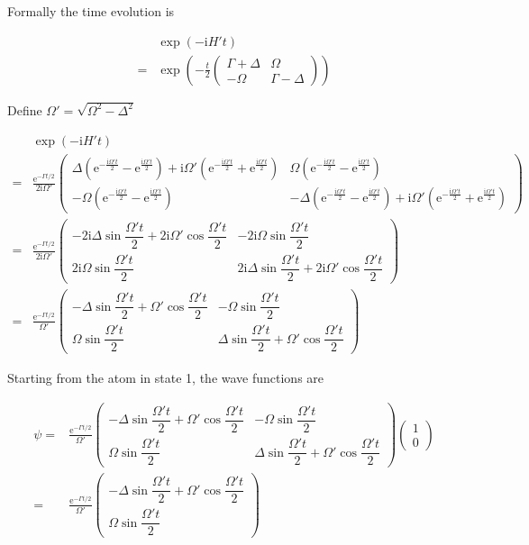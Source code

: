 \documentclass[10pt,fleqn]{article}
\newcommand{\ue}{\mathrm{e}}
\newcommand{\ui}{\mathrm{i}}
\newcommand{\eqar}[1]
{
  \begin{align*}
    #1
  \end{align*}
}
\newcommand{\paren}[1]{{\left({#1}\right)}}
\begin{document}
Formally the time evolution is
\eqar{
  &\exp\paren{-\ui H't}\\
  =&\exp\paren{-\frac t2\begin{pmatrix}
      \Gamma+\Delta&\Omega\\
      -\Omega&\Gamma-\Delta
    \end{pmatrix}}
}
Define $\Omega'=\sqrt{\Omega^2-\Delta^2}$
\eqar{
  &\exp\paren{-\ui H't}\\
  =&\frac{\ue^{-\Gamma t/2}}{2\ui\Omega'}\begin{pmatrix}
    \Delta\paren{\ue^{-\frac{\ui\Omega't}{2}}-\ue^{\frac{\ui\Omega't}{2}}}+\ui\Omega'\paren{\ue^{-\frac{\ui\Omega't}{2}}+\ue^{\frac{\ui\Omega't}{2}}}&\Omega\paren{\ue^{-\frac{\ui\Omega't}{2}}-\ue^{\frac{\ui\Omega't}{2}}}\\
    -\Omega\paren{\ue^{-\frac{\ui\Omega't}{2}}-\ue^{\frac{\ui\Omega't}{2}}}&-\Delta\paren{\ue^{-\frac{\ui\Omega't}{2}}-\ue^{\frac{\ui\Omega't}{2}}}+\ui\Omega'\paren{\ue^{-\frac{\ui\Omega't}{2}}+\ue^{\frac{\ui\Omega't}{2}}}
  \end{pmatrix}\\
  =&\frac{\ue^{-\Gamma t/2}}{2\ui\Omega'}\begin{pmatrix}
    -2\ui\Delta\sin\dfrac{\Omega't}{2}+2\ui\Omega'\cos\dfrac{\Omega't}{2}&-2\ui\Omega\sin\dfrac{\Omega't}{2}\\
    2\ui\Omega\sin\dfrac{\Omega't}{2}&2\ui\Delta\sin\dfrac{\Omega't}{2}+2\ui\Omega'\cos\dfrac{\Omega't}{2}
  \end{pmatrix}\\
  =&\frac{\ue^{-\Gamma t/2}}{\Omega'}\begin{pmatrix}
    -\Delta\sin\dfrac{\Omega't}{2}+\Omega'\cos\dfrac{\Omega't}{2}&-\Omega\sin\dfrac{\Omega't}{2}\\
    \Omega\sin\dfrac{\Omega't}{2}&\Delta\sin\dfrac{\Omega't}{2}+\Omega'\cos\dfrac{\Omega't}{2}
  \end{pmatrix}
}
Starting from the atom in state 1, the wave functions are
\eqar{
  \psi=&\frac{\ue^{-\Gamma t/2}}{\Omega'}\begin{pmatrix}
    -\Delta\sin\dfrac{\Omega't}{2}+\Omega'\cos\dfrac{\Omega't}{2}&-\Omega\sin\dfrac{\Omega't}{2}\\
    \Omega\sin\dfrac{\Omega't}{2}&\Delta\sin\dfrac{\Omega't}{2}+\Omega'\cos\dfrac{\Omega't}{2}
  \end{pmatrix}\begin{pmatrix}
    1\\
    0
  \end{pmatrix}\\
  =&\frac{\ue^{-\Gamma t/2}}{\Omega'}\begin{pmatrix}
    -\Delta\sin\dfrac{\Omega't}{2}+\Omega'\cos\dfrac{\Omega't}{2}\\
    \Omega\sin\dfrac{\Omega't}{2}
  \end{pmatrix}
}
\end{document}
